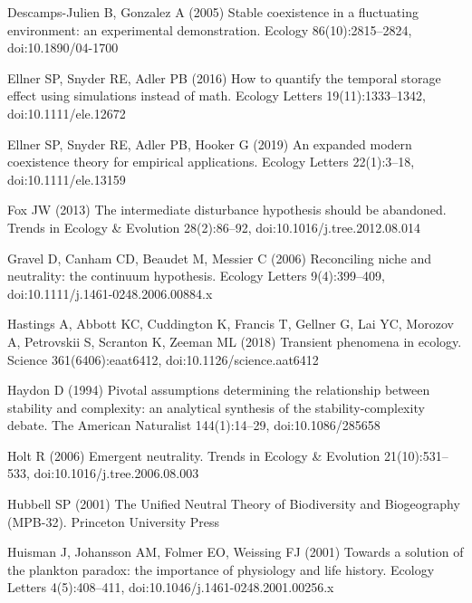 \documentclass[a4paper,12pt]{article}
\begin{document}
\begin{thebibliography}{68}
Descamps-Julien B, Gonzalez A (2005) Stable coexistence in a fluctuating
  environment: an experimental demonstration. Ecology 86(10):2815--2824,
  doi:{10.1890/04-1700}

Ellner SP, Snyder RE, Adler PB (2016) How to quantify the temporal storage
  effect using simulations instead of math. Ecology Letters 19(11):1333--1342,
  doi:{10.1111/ele.12672}

Ellner SP, Snyder RE, Adler PB, Hooker G (2019) An expanded modern coexistence
  theory for empirical applications. Ecology Letters 22(1):3--18,
  doi:{10.1111/ele.13159}

Fox JW (2013) The intermediate disturbance hypothesis should be abandoned.
  Trends in Ecology \& Evolution 28(2):86--92, doi:{10.1016/j.tree.2012.08.014}

Gravel D, Canham CD, Beaudet M, Messier C (2006) {Reconciling} niche and
  neutrality: the continuum hypothesis.
  Ecology Letters 9(4):399--409, doi:{10.1111/j.1461-0248.2006.00884.x}

Hastings A, Abbott KC, Cuddington K, Francis T, Gellner G, Lai YC, Morozov A,
  Petrovskii S, Scranton K, Zeeman ML (2018) Transient phenomena in ecology.
  Science 361(6406):eaat6412, doi:{10.1126/science.aat6412}

Haydon D (1994) Pivotal assumptions determining the relationship between
  stability and complexity: an analytical synthesis of the stability-complexity
  debate. The American Naturalist 144(1):14--29, doi:{10.1086/285658}

Holt R (2006) Emergent neutrality. Trends in Ecology \& Evolution
  21(10):531--533, doi:{10.1016/j.tree.2006.08.003}

Hubbell SP (2001) The {Unified} {Neutral} {Theory} of {Biodiversity} and
  {Biogeography} ({MPB}-32). Princeton University Press

Huisman J, Johansson AM, Folmer EO, Weissing FJ (2001) Towards a solution of
  the plankton paradox: the importance of physiology and life history. Ecology
  Letters 4(5):408--411, doi:{10.1046/j.1461-0248.2001.00256.x}


\end{thebibliography}
\end{document}
